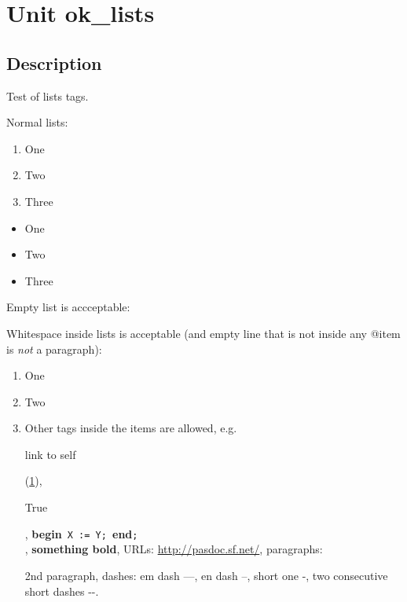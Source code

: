 \documentclass{report}
\begin{document}
\label{toc}\tableofcontents
\newpage
\newlength{\tmplength}
\chapter{Unit ok{\_}lists}
\label{ok_lists}
\section{Description}
Test of lists tags.\hfill\vspace*{1ex}



Normal lists: \begin{enumerate}
\setcounter{enumi}{0} \setcounter{enumii}{0} \setcounter{enumiii}{0} \setcounter{enumiv}{0} 
\item One
\setcounter{enumi}{1} \setcounter{enumii}{1} \setcounter{enumiii}{1} \setcounter{enumiv}{1} 
\item Two
\setcounter{enumi}{2} \setcounter{enumii}{2} \setcounter{enumiii}{2} \setcounter{enumiv}{2} 
\item Three
\end{enumerate} \begin{itemize}
\item One
\item Two
\item Three
\end{itemize}

Empty list is accceptable:  

Whitespace inside lists is acceptable (and empty line that is not inside any @item is \textit{not} a paragraph): \begin{enumerate}
\setcounter{enumi}{0} \setcounter{enumii}{0} \setcounter{enumiii}{0} \setcounter{enumiv}{0} 
\item One
\setcounter{enumi}{1} \setcounter{enumii}{1} \setcounter{enumiii}{1} \setcounter{enumiv}{1} 
\item Two
\setcounter{enumi}{2} \setcounter{enumii}{2} \setcounter{enumiii}{2} \setcounter{enumiv}{2} 
\item  Other tags inside the items are allowed, e.g. \begin{ttfamily}link to self\end{ttfamily}(\ref{ok_lists}), \begin{ttfamily}True\end{ttfamily}, \texttt{}\textbf{begin}\texttt{~X~:=~Y;~}\textbf{end}\texttt{;\\
}, \textbf{something bold}, URLs: \href{http://pasdoc.sf.net/}{http://pasdoc.sf.net/}, paragraphs:

2nd paragraph, dashes: em dash ---, en dash --, short one {-}, two consecutive short dashes {-}{-}. 
\end{enumerate}
\end{document}
